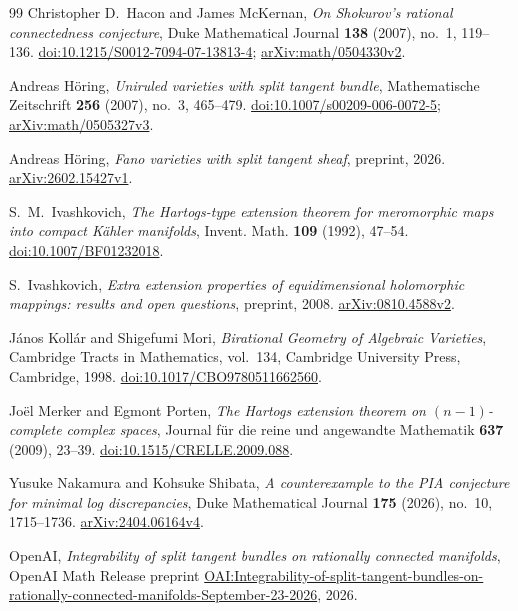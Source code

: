 \begin{thebibliography}{99}
Christopher D.~Hacon and James McKernan,
\emph{On Shokurov's rational connectedness conjecture},
Duke Mathematical Journal \textbf{138} (2007), no.~1, 119--136.
\href{https://doi.org/10.1215/S0012-7094-07-13813-4}{doi:10.1215/S0012-7094-07-13813-4};
\href{https://arxiv.org/abs/math/0504330v2}{arXiv:math/0504330v2}.

Andreas H\"oring,
\emph{Uniruled varieties with split tangent bundle},
Mathematische Zeitschrift \textbf{256} (2007), no.~3, 465--479.
\href{https://doi.org/10.1007/s00209-006-0072-5}{doi:10.1007/s00209-006-0072-5};
\href{https://arxiv.org/pdf/math/0505327v3}{arXiv:math/0505327v3}.

Andreas H\"oring,
\emph{Fano varieties with split tangent sheaf},
preprint, 2026.
\href{https://arxiv.org/abs/2602.15427v1}{arXiv:2602.15427v1}.

S.~M.~Ivashkovich,
\emph{The Hartogs-type extension theorem for meromorphic maps into
compact K\"ahler manifolds},
Invent. Math. \textbf{109} (1992), 47--54.
\href{https://doi.org/10.1007/BF01232018}{doi:10.1007/BF01232018}.

S.~Ivashkovich,
\emph{Extra extension properties of equidimensional holomorphic mappings:
results and open questions},
preprint, 2008.
\href{https://arxiv.org/abs/0810.4588v2}{arXiv:0810.4588v2}.

J\'anos Koll\'ar and Shigefumi Mori,
\emph{Birational Geometry of Algebraic Varieties},
Cambridge Tracts in Mathematics, vol.~134,
Cambridge University Press, Cambridge, 1998.
\href{https://doi.org/10.1017/CBO9780511662560}{doi:10.1017/CBO9780511662560}.

Jo\"el Merker and Egmont Porten,
\emph{The Hartogs extension theorem on $(n-1)$-complete complex spaces},
Journal f\"ur die reine und angewandte Mathematik
\textbf{637} (2009), 23--39.
\href{https://doi.org/10.1515/CRELLE.2009.088}{doi:10.1515/CRELLE.2009.088}.

Yusuke Nakamura and Kohsuke Shibata,
\emph{A counterexample to the PIA conjecture for minimal log discrepancies},
Duke Mathematical Journal \textbf{175} (2026), no.~10, 1715--1736.
\href{https://arxiv.org/abs/2404.06164v4}{arXiv:2404.06164v4}.

OpenAI,
\emph{Integrability of split tangent bundles on rationally connected manifolds},
OpenAI Math Release preprint
\href{https://github.com/openai/math/blob/main/preprints/Integrability-of-split-tangent-bundles-on-rationally-connected-manifolds-September-23-2026/main.pdf}{OAI:Integrability-of-split-tangent-bundles-on-rationally-connected-manifolds-September-23-2026},
2026.


\end{thebibliography}
